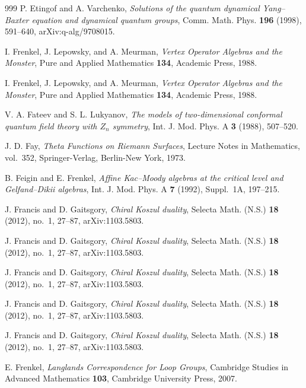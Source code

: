 \begin{thebibliography}{999}
P. Etingof and A. Varchenko, \emph{Solutions of the quantum dynamical Yang--Baxter equation and dynamical quantum groups}, Comm. Math. Phys. \textbf{196} (1998), 591--640, arXiv:q-alg/9708015.

I. Frenkel, J. Lepowsky, and A. Meurman, \emph{Vertex Operator Algebras and the Monster}, Pure and Applied Mathematics \textbf{134}, Academic Press, 1988.

I. Frenkel, J. Lepowsky, and A. Meurman, \emph{Vertex Operator Algebras and the Monster}, Pure and Applied Mathematics \textbf{134}, Academic Press, 1988.

V. A. Fateev and S. L. Lukyanov, \emph{The models of two-dimensional conformal quantum field theory with $Z_n$ symmetry}, Int. J. Mod. Phys. A \textbf{3} (1988), 507--520.

J. D. Fay, \emph{Theta Functions on Riemann Surfaces}, Lecture Notes in Mathematics, vol.~352, Springer-Verlag, Berlin-New York, 1973.

B. Feigin and E. Frenkel, \emph{Affine Kac--Moody algebras at the critical level and Gelfand--Dikii algebras}, Int. J. Mod. Phys. A \textbf{7} (1992), Suppl.~1A, 197--215.

J. Francis and D. Gaitsgory, \emph{Chiral Koszul duality}, Selecta Math. (N.S.) \textbf{18} (2012), no.~1, 27--87, arXiv:1103.5803.

J. Francis and D. Gaitsgory, \emph{Chiral Koszul duality}, Selecta Math. (N.S.) \textbf{18} (2012), no.~1, 27--87, arXiv:1103.5803.

J. Francis and D. Gaitsgory, \emph{Chiral Koszul duality}, Selecta Math. (N.S.) \textbf{18} (2012), no.~1, 27--87, arXiv:1103.5803.

J. Francis and D. Gaitsgory, \emph{Chiral Koszul duality}, Selecta Math. (N.S.) \textbf{18} (2012), no.~1, 27--87, arXiv:1103.5803.

J. Francis and D. Gaitsgory, \emph{Chiral Koszul duality}, Selecta Math. (N.S.) \textbf{18} (2012), no.~1, 27--87, arXiv:1103.5803.

E. Frenkel, \emph{Langlands Correspondence for Loop Groups}, Cambridge Studies in Advanced Mathematics \textbf{103}, Cambridge University Press, 2007.


\end{thebibliography}
